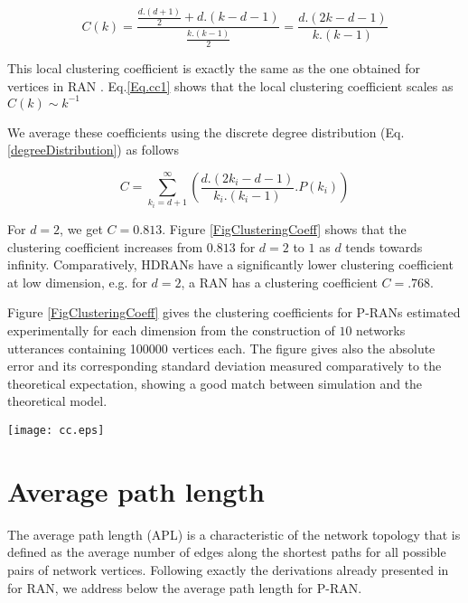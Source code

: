 \documentclass[11pt]{iopart}
\begin{document}
\begin{equation}
\label{Eq.cc1}
   C(k)=\frac{\frac{d.(d+1)}{2}+d.(k-d-1)}{\frac{k.(k-1)}{2}} = \frac{d.(2k-d-1)}{k.(k-1)} 
\end{equation}

This local clustering coefficient is exactly the same as the one obtained for vertices in RAN \cite{zhang-2006a}. Eq.\ref{Eq.cc1} shows that the local clustering coefficient scales as $C(k) \sim k^{-1}$

We average these coefficients using the discrete degree distribution (Eq.\ref{degreeDistribution}) as follows

\begin{equation}
\label{Eq.cc2}
   C=\sum_{k_i=d+1}^{\infty} \left(\frac{d.(2k_i-d-1)}{k_i.(k_i-1)}.P(k_i) \right)
\end{equation}

For $d=2$, we get $C=0.813$. Figure \ref{FigClusteringCoeff} shows that the clustering coefficient increases from $0.813$ for $d=2$ to $1$ as $d$ tends towards infinity. Comparatively, HDRANs have a significantly lower clustering coefficient at low dimension, e.g. for $d=2$, a RAN has a clustering coefficient $C=.768$. 

Figure \ref{FigClusteringCoeff} gives the clustering coefficients for P-RANs estimated experimentally for each dimension from the construction of  $10$ networks utterances containing 100000 vertices each. The figure gives also the absolute error and its corresponding standard deviation measured comparatively to the theoretical expectation, showing a good match between simulation and the theoretical model.

\begin{figure*}[htbp]
\centering
\texttt{[image: cc.eps]}
\caption{Clustering coefficient of a P-RAN as a function of the dimension. Error and standard deviation to theory are given on the right vertical axis.}
\label{FigClusteringCoeff}
\end{figure*}



\section{Average path length}

The average path length (APL) is a characteristic of the network topology that is defined as the average number of edges along the shortest paths for all possible pairs of network vertices. Following exactly the derivations already presented in \cite{zhou-2004,zhang-2007-380} for RAN, we address below the average path length for P-RAN.
\end{document}
